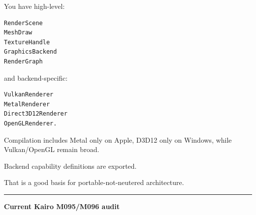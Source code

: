 You have high-level:

\begin{verbatim}
RenderScene
MeshDraw
TextureHandle
GraphicsBackend
RenderGraph
\end{verbatim}

and backend-specific:

\begin{verbatim}
VulkanRenderer
MetalRenderer
Direct3D12Renderer
OpenGLRenderer.
\end{verbatim}

Compilation includes Metal only on Apple, D3D12 only on Windows, while Vulkan/OpenGL remain broad.

Backend capability definitions are exported.

That is a good basis for portable-not-neutered architecture.

\begin{center}\rule{0.5\linewidth}{0.5pt}\end{center}

\textbf{Current Kairo M095/M096 audit}

